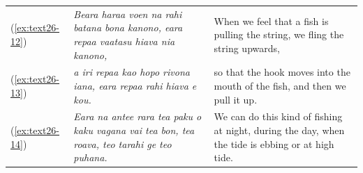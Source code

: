 \documentclass[output=paper]{langscibook}
\begin{document}
\begin{xltabular}{\textwidth}{lXX}
	(\ref{ex:text26-12})&\textit{Beara haraa voen na rahi batana bona kanono, eara repaa vaatasu hiava nia kanono,}&When we feel that a fish is pulling the string, we fling the string upwards,\\
	(\ref{ex:text26-13})&\textit{a iri repaa kao hopo rivona iana, eara repaa rahi hiava e kou.}&so that the hook moves into the mouth of the fish, and then we pull it up.\\
	(\ref{ex:text26-14})&\textit{Eara na antee rara tea paku o kaku vagana vai tea bon, tea roava, teo tarahi ge teo puhana.}&We can do this kind of fishing at night, during the day, when the tide is ebbing or at high tide.\\
\end{xltabular}
\end{document}

